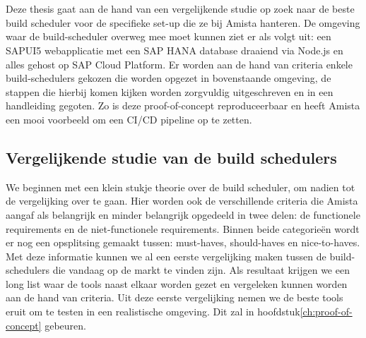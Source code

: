 
\chapter{}
\label{ch:methodologie}

Deze thesis gaat aan de hand van een vergelijkende studie op zoek naar de beste build scheduler voor de specifieke set-up die ze bij Amista hanteren. De omgeving waar de build-scheduler overweg mee moet kunnen ziet er als volgt uit: een SAPUI5 webapplicatie met een SAP HANA database draaiend via Node.js en alles gehost op SAP Cloud Platform. Er worden aan de hand van criteria enkele build-schedulers gekozen die worden opgezet in bovenstaande omgeving, de stappen die hierbij komen kijken worden zorgvuldig uitgeschreven en in een handleiding gegoten. Zo is deze proof-of-concept reproduceerbaar en heeft Amista een mooi voorbeeld om een CI/CD pipeline op te zetten.


    \section{Vergelijkende studie van de build schedulers}
    \label{sec:Vergelijkende-studie-build-schedulers}
    We beginnen met een klein stukje theorie over de build scheduler, om nadien tot de vergelijking over te gaan. Hier worden ook de verschillende criteria die Amista aangaf als belangrijk en minder belangrijk opgedeeld in twee delen: de functionele requirements en de niet-functionele requirements. Binnen beide categorieën wordt er nog een opsplitsing gemaakt tussen: must-haves, should-haves en nice-to-haves.
    Met deze informatie kunnen we al een eerste vergelijking maken tussen de build-schedulers die vandaag op de markt te vinden zijn. Als resultaat krijgen we een long list waar de tools naast elkaar worden gezet en vergeleken kunnen worden aan de hand van criteria. 
    Uit deze eerste vergelijking nemen we de beste tools eruit om te testen in een realistische omgeving. Dit zal in hoofdstuk\ref{ch:proof-of-concept} gebeuren.

